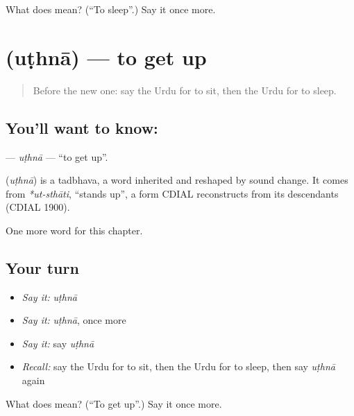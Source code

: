 \begin{tcolorbox}[breakable,colback=teal!4,colframe=teal!35!black,title={Before you move on}]
What does  mean? (\textquotedblleft{}To sleep\textquotedblright{}.) Say it once more.
\end{tcolorbox}
\section[\texorpdfstring{\ur{اٹھنا} (uṭhnā)}{اٹھنا (uṭhnā)}]{ (uṭhnā) — to get up}

\label{lesson:UR-C47-uthna}



\begin{quote}
Before the new one: say the Urdu for to sit, then the Urdu for to sleep.
\end{quote}

\subsection*{You'll want to know: }
\textbf{} — \emph{uṭhnā} — \textquotedblleft{}to get up\textquotedblright{}.

\begin{cousinweb}
\textbf{} (\emph{uṭhnā}) is a tadbhava, a word inherited and reshaped by sound change. It comes from \emph{*ut-sthāti}, \textquotedblleft{}stands up\textquotedblright{}, a form CDIAL reconstructs from its descendants (CDIAL 1900).
\end{cousinweb}

\begin{grammarlens}[title={What you've built}]
One more word for this chapter.
\end{grammarlens}

\subsection*{Your turn}
\begin{itemize}
\raggedright
  \item \emph{Say it:} \emph{uṭhnā}
  \item \emph{Say it:} \emph{uṭhnā}, once more
  \item \emph{Say it:} say \emph{uṭhnā}
  \item \emph{Recall:} say the Urdu for to sit, then the Urdu for to sleep, then say \emph{uṭhnā} again
\end{itemize}

\begin{tcolorbox}[breakable,colback=teal!4,colframe=teal!35!black,title={Before you move on}]
What does  mean? (\textquotedblleft{}To get up\textquotedblright{}.) Say it once more.
\end{tcolorbox}
